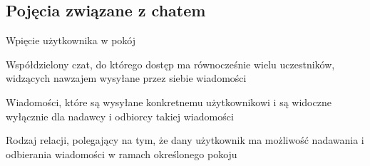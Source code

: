 \subsection{Pojęcia związane z chatem}
\label{slownik_pojec_chatu}

\begin{labeling}{Wpięcie użytkownika w pokój}
    \item[Pokój] Współdzielony czat, do którego dostęp ma równocześnie wielu uczestników, widzących nawzajem
        wysyłane przez siebie wiadomości
    \item[Wiadomości prywatne] Wiadomości, które są wysyłane konkretnemu użytkownikowi i są widoczne wyłącznie
        dla nadawcy i odbiorcy takiej wiadomości
    \item[Wpięcie użytkownika w pokój] Rodzaj relacji, polegający na tym, że dany użytkownik ma możliwość
        nadawania i odbierania wiadomości w ramach określonego pokoju
\end{labeling}
